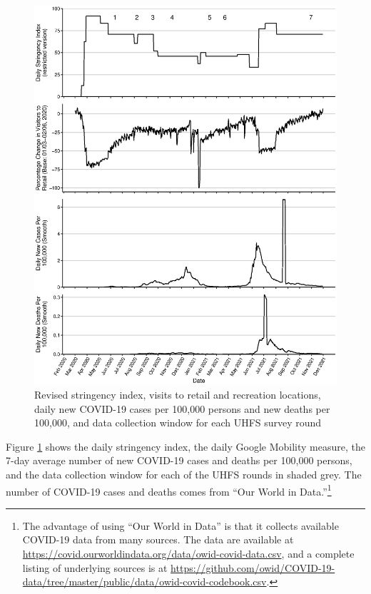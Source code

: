 \documentclass{wber}
\begin{document}
\begin{figure}
\caption{Revised stringency index, visits to retail and recreation
locations, daily new COVID-19 cases per 100,000 persons and new deaths
per 100,000, and data collection window for each UHFS survey
round}\label{fig:combined}
\begin{center}
\includegraphics[width=\linewidth, keepaspectratio]{./eps/fig_02.eps}
\end{center}
\end{figure}

Figure \ref{fig:combined} shows the daily stringency index, the daily
Google Mobility measure, the 7-day average number of new COVID-19 cases
and deaths per 100,000 persons, and the data collection window for each
of the UHFS rounds in shaded grey. The number of COVID-19 cases and
deaths comes from ``Our World in Data.''\footnote{The advantage of using
  ``Our World in Data'' is that it collects available COVID-19 data from
  many sources. The data are available
  at \url{https://covid.ourworldindata.org/data/owid-covid-data.csv},
  and a complete listing of underlying sources is
  at \url{https://github.com/owid/COVID-19-data/tree/master/public/data/owid-covid-codebook.csv}.}
\end{document}
